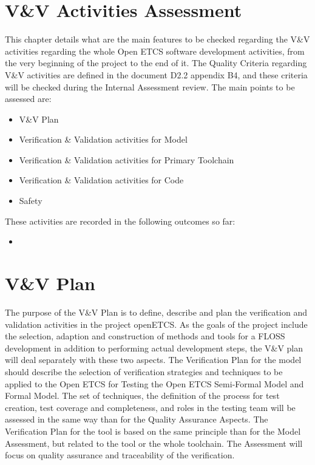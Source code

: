 \documentclass{template/openetcs_article}
\begin{document}
\section{V\&V Activities Assessment}
This chapter details what are the main features to be checked regarding the V\&V activities regarding the whole Open ETCS software development activities, from the very beginning of the project to the end of it.
The Quality Criteria regarding V\&V activities are defined in the document D2.2 appendix B4, and these criteria will be checked during the Internal Assessment review. The main points to be assessed are:
\begin{itemize}
\item V\&V Plan
\item Verification \& Validation activities for Model
\item Verification \& Validation activities for Primary Toolchain
\item Verification \& Validation activities for Code
\item Safety
\end{itemize}
These activities are recorded in the following outcomes so far:
\begin{itemize}
\item  
\end{itemize}

\section{V\&V Plan}
The purpose of the V\&V Plan is to define, describe and plan the verification and validation activities in the project openETCS. As the goals of the project include the selection, adaption and construction of methods and tools for a FLOSS development in addition to performing actual development steps, the V\&V plan will deal separately with these two aspects.
The Verification Plan for the model should describe the selection of verification strategies and techniques to be applied to the Open ETCS for Testing the Open ETCS Semi-Formal Model and Formal Model. The set of techniques, the definition of the process for test creation, test coverage and completeness, and roles in the testing team will be assessed in the same way than for the Quality Assurance Aspects.
The Verification Plan for the tool is based on the same principle than for the Model Assessment, but related to the tool or the whole toolchain. The Assessment will focus on quality assurance and traceability of the verification.
\end{document}
